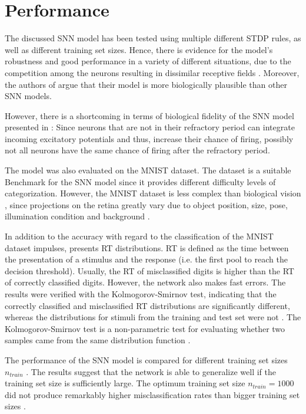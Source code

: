 \section{Performance}
\label{sec:result}

The discussed \ac{SNN} model has been tested using multiple different \ac{STDP} rules, as well as different training set sizes. 
Hence, there is evidence for the model's robustness and good performance in a variety of different situations, 
due to the competition among the neurons resulting in dissimilar receptive fields \cite{SNN}.
Moreover, the authors of \cite{SNN} argue that their model is more biologically plausible than other \ac{SNN} models.

However, there is a shortcoming in terms of biological fidelity of the \ac{SNN} model presented in \cite{SNN}:
Since neurons that are not in their refractory period can integrate incoming excitatory potentials and thus, 
increase their chance of firing, possibly not all neurons have the same chance of firing after the refractory period.

The \cite{STDP_like} model was also evaluated on the MNIST dataset.
The dataset is a suitable Benchmark for the \ac{SNN} model 
since it provides different difficulty levels of categorization.
However, the MNIST dataset is less complex than biological vision \cite{STDP_like}, 
since projections on the retina greatly vary due to object position, size, pose, illumination condition and background \cite{multi_scale_STDP}.

In addition to the accuracy with regard to the classification of the MNIST dataset impulses, \cite{STDP_like} presents \ac{RT} distributions.
\ac{RT} is defined as the time between the presentation of a stimulus and the response (i.e. the first pool to reach the decision threshold).
Usually, the \ac{RT} of misclassified digits is higher than the \ac{RT} of correctly classified digits.
However, the network also makes fast errors.
The results were verified with the Kolmogorov-Smirnov test, 
indicating that the correctly classified and misclassified \ac{RT} distributions are significantly different, 
whereas the distributions for stimuli from the training and test set were not \cite{STDP_like}.
The Kolmogorov-Smirnov test is a non-parametric test for evaluating whether two samples came from the same distribution function \cite{Kolmogorov_Smirnov}.

The performance of the \ac{SNN} model is compared for different training set sizes $n_{train}$ \cite{STDP_like}.
The results suggest that the network is able to generalize well if the training set size is sufficiently large.
The optimum training set size $n_{train} = 1000$ did not produce remarkably higher misclassification rates than bigger training set sizes \cite{STDP_like}.


